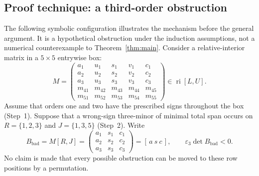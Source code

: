 \documentclass[10pt,a4paper]{article}
\theoremstyle{definition}
\theoremstyle{remark}
\numberwithin{equation}{section}
\newcommand{\eps}{\varepsilon}
\DeclareMathOperator{\ri}{ri}
\begin{document}
\subsection{Proof technique: a third-order obstruction}\label{sec:example}
The following symbolic configuration illustrates the mechanism before the
general argument. It is a hypothetical obstruction under the induction
assumptions, not a numerical counterexample to Theorem~\ref{thm:main}.
Consider a relative-interior matrix in a $5\times5$ entrywise box:
\begin{equation}\label{eq:M55}
 M=\begin{pmatrix}
 a_1&u_1&s_1&v_1&c_1\\
 a_2&u_2&s_2&v_2&c_2\\
 a_3&u_3&s_3&v_3&c_3\\
 m_{41}&m_{42}&m_{43}&m_{44}&m_{45}\\
 m_{51}&m_{52}&m_{53}&m_{54}&m_{55}
 \end{pmatrix}\in\ri[L,U].
\end{equation}
Assume that orders one and two have the prescribed signs throughout the
box (Step~1). Suppose that a wrong-sign three-minor of minimal total span
occurs on $R=\{1,2,3\}$ and $J=\{1,3,5\}$ (Step~2). Write
\begin{equation}\label{eq:Bbad}
 B_{\mathrm{bad}}=M[R,J]=\begin{pmatrix}a_1&s_1&c_1\\a_2&s_2&c_2\\a_3&s_3&c_3\end{pmatrix}
 =[\,a\ s\ c\,],\qquad \eps_3\det B_{\mathrm{bad}}<0.
\end{equation}
No claim is made that every possible obstruction can be moved to these
row positions by a permutation.
\end{document}
